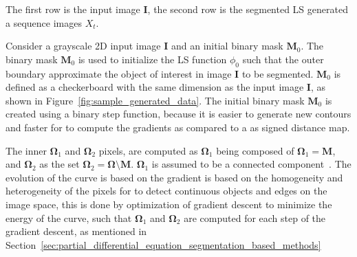 \documentclass{WitsPhysicsReport}
\begin{document}
The first row is the input image $\mathbf{I}$, the second row is the segmented LS generated a sequence images $X_{t}$.

Consider a grayscale 2D input image $\mathbf{I}$ and an initial binary mask $\mathbf{M}_{0}$. The binary mask  $\mathbf{M}_{0}$ is used to initialize the LS function $\phi_{0}$ such that the outer boundary approximate the object of interest in image $\mathbf{I}$ to be segmented. $\mathbf{M}_{0}$ is defined as a checkerboard with the same dimension as the input image $\mathbf{I}$, as shown in Figure~\ref{fig:sample_generated_data}. The initial binary mask $\mathbf{M}_{0}$ is created using a binary step function, because it is easier to generate new contours and faster for to compute the gradients as compared to a as signed distance map.

The inner $\mathbf{\Omega}_{1}$ and $\mathbf{\Omega}_{2}$  pixels, are computed as $\mathbf{\Omega}_{1}$ being composed of $\mathbf{\Omega}_{1}=\mathbf{M}$, and $\mathbf{\Omega}_{2}$  as the set $\mathbf{\Omega}_{2}=\mathbf{\Omega} \setminus  \mathbf{M}$. $\mathbf{\Omega}_{1}$ is assumed to be a connected component~\cite{garrido2015image}. The evolution of the curve is based on the gradient is based on the homogeneity and heterogeneity of the pixels for to detect continuous objects and edges on the image space, this is done by optimization of gradient descent to minimize the energy of the curve, such that $\mathbf{\Omega}_{1}$ and $\mathbf{\Omega}_{2}$ are computed for each step of the gradient descent, as mentioned in Section~\ref{sec:partial_differential_equation_segmentation_based_methods}




\end{document}
